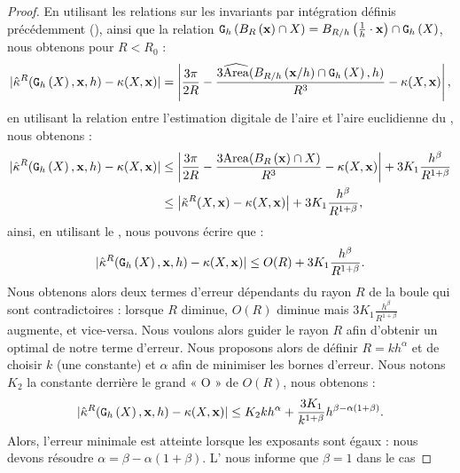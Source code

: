 \begin{proof}
  En utilisant les relations sur les invariants par intégration définis
  précédemment (), ainsi que la relation
  $\DigF{\Ball{R}{\vx} \cap \Shape}{h}=\Ball{R/h}{\frac{1}{h} \cdot \vx} \cap
  \DSh$, nous obtenons pour $R < R_0$ :
  \begin{equation}
    | \CurvH{R}(\DSh,\vx,h) - \Curv(\Shape,\vx) |
    = \left|\frac{3\pi}{2R}-\frac{3\AreaC(\Ball{R/h}{\vx / h} \cap \DSh, h)}{R^3} - \Curv(\Shape,\vx) \right|,
  \end{equation}
  en utilisant la relation entre l'estimation digitale de l'aire et l'aire
  euclidienne du , nous obtenons :
  \begin{align}\label{eq-curvhat-error-bound-prelim}
    | \CurvH{R}(\DSh,\vx,h) - \Curv(\Shape,\vx) |
    &\le \left|\frac{3\pi}{2R}-\frac{3\Area(\Ball{R}{\vx} \cap \Shape)}{R^3} - \Curv(\Shape,\vx) \right| + 3K_1 \frac{h^\beta}{R^{1+\beta}} \nonumber \\
    &\le \left|\CurvT{R}(\Shape,\vx) - \Curv(\Shape,\vx) \right| + 3K_1 \frac{h^\beta}{R^{1+\beta}},
  \end{align}
  ainsi, en utilisant le , nous pouvons
  écrire que :
  \begin{equation}\label{eq-curvhat-error-bound-prelim2}
    | \CurvH{R}(\DSh,\vx,h) - \Curv(\Shape,\vx) |
    \le O(R) + 3K_1 \frac{h^\beta}{R^{1+\beta}}.
  \end{equation}
  Nous obtenons alors deux termes d'erreur dépendants du rayon $R$ de la boule
  qui sont contradictoires : lorsque $R$ diminue, $O(R)$ diminue mais $3K_1
  \frac{h^\beta}{R^{1+\beta}}$ augmente, et vice-versa. Nous voulons alors
  guider le rayon $R$ afin d'obtenir un optimal de notre terme d'erreur. Nous
  proposons alors de définir $R = k h^{\alpha}$ et de choisir $k$ (une
  constante) et $\alpha$ afin de minimiser les bornes d'erreur. Nous notons
  $K_2$ la constante derrière le grand « O » de $O(R)$, nous obtenons :
  \begin{equation}\label{eq-curvhat-error-bound-prelim3}
    | \CurvH{R}(\DSh,\vx,h) - \Curv(\Shape,\vx) |
    \le K_2kh^\alpha + \frac{3K_1}{k^{1+\beta}}h^{\beta - \alpha(1+\beta)}.
  \end{equation}
  Alors, l'erreur minimale est atteinte lorsque les exposants sont égaux : nous
  devons résoudre $\alpha = \beta - \alpha(1+\beta)$.
  L' nous informe que $\beta = 1$ dans le cas

\end{proof}
